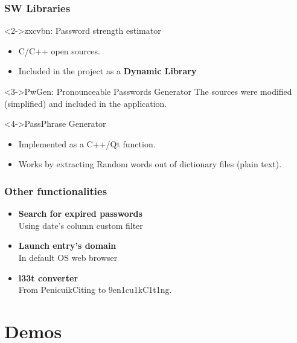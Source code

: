 \documentclass[14pt,usenames,dvipsnames]{beamer}
\begin{document}
\begin{frame}
  \frametitle{SW Libraries}

	  \begin{block}<2->{zxcvbn: Password strength estimator}
		\begin{itemize}
		\setlength\itemsep{0pt}
			\item C/C++ open sources.
			\item Included in the project as a \textbf{\color{NavyBlue} Dynamic Library}
		\end{itemize}
	\end{block}


	\begin{block}<3->{PwGen: Pronounceable Passwords Generator}
    The sources were modified (simplified) and included in the application.
  \end{block}


	\begin{block}<4->{PassPhrase Generator}
		\begin{itemize}
				\setlength\itemsep{0pt}
		  \item Implemented as a C++/Qt function.
		  \item Works by extracting Random words out of dictionary files (plain text).
		\end{itemize}
  \end{block}
\end{frame}

\begin{frame}
	\frametitle{Other functionalities}
  \begin{itemize}
  	\setlength\itemsep{25pt}
    \item<2-> \textbf{Search for expired passwords} \\
    Using date's column custom filter
    \item<3-> \textbf{Launch entry's domain} \\
    In default OS web browser
    \item<4-> \textbf{l33t converter} \\
    From {\color{NavyBlue} PenicuikCiting} to {\color{NavyBlue} 9en1cu1kC1t1ng}.

  \end{itemize}  	
	
\end{frame}




\section{Demos}
\end{document}
